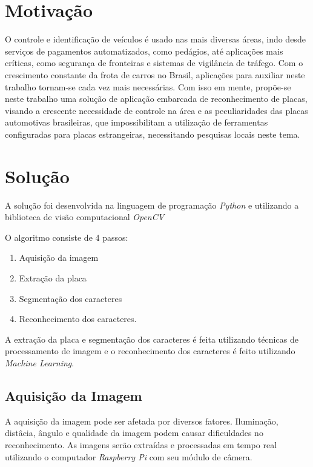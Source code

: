 \documentclass[a0,portrait]{a0poster}
\begin{document}
\begin{multicols}{2}

\color{NavyBlue}
\section*{\huge Motivação}
\color{Black}
\Large
\justifying

O controle e identificação de veículos é usado nas mais diversas áreas, indo
desde serviços de pagamentos automatizados, como pedágios, até aplicações
mais críticas, como segurança de fronteiras e sistemas de vigilância de
tráfego. Com o crescimento constante da frota de carros no Brasil,
aplicações para auxiliar neste trabalho tornam-se cada vez mais necessárias.
Com isso em mente, propõe-se neste trabalho uma solução de aplicação
embarcada de reconhecimento de placas, visando a crescente necessidade de
controle na área e as peculiaridades das placas automotivas brasileiras, que
impossibilitam a utilização de ferramentas configuradas para placas
estrangeiras, necessitando pesquisas locais neste tema.

\color{NavyBlue}
\section*{\huge Solução}
\color{Black}

A solução foi desenvolvida na linguagem de programação \emph{Python} e utilizando
a biblioteca de visão computacional \emph{OpenCV}

O algoritmo consiste de 4 passos:
	
\begin{enumerate}
	\item Aquisição da imagem
	\item Extração da placa
	\item Segmentação dos caracteres
	\item Reconhecimento dos caracteres.
\end{enumerate}

A extração da placa e segmentação dos caracteres é feita utilizando técnicas de
processamento de imagem e o reconhecimento dos caracteres é feito utilizando
\emph{Machine Learning}.

\color{NavyBlue}
\subsection*{Aquisição da Imagem}
\color{Black}
\Large
\justifying

A aquisição da imagem pode ser afetada por diversos fatores. Iluminação, distâcia,
ângulo e qualidade da imagem podem causar dificuldades no reconhecimento. As imagens
serão extraídas e processadas em tempo real utilizando o computador \emph{Raspberry Pi}
com seu módulo de câmera.


\end{multicols}
\end{document}
